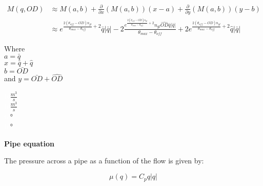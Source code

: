 \begin{equation}
\begin{split}
	M(q,OD) &\approx M(a,b) + \frac{\partial}{\partial x} (M(a,b)) (x-a) + \frac{\partial}{\partial y} (M(a,b)) (y-b) \\
			&\approx e^{\frac{2 (\theta_{off} - \bar{OD}) n_{gl}}{\theta_{max}-\theta_{off}}+2} \bar{q} |\bar{q}| -2 \frac{e^{\frac{2 (\theta_{off} - \bar{OD}) n_{gl}}{\theta_{max}-\theta_{off}}+2} n_{gl} \hat{OD} \bar{q} |\bar{q}|}{\theta_{max}-\theta_{off}} + 2 e^{\frac{2 (\theta_{off} - \bar{OD}) n_{gl}}{\theta_{max}-\theta_{off}}+2} \hat{q} |\bar{q}|
\end{split}
\end{equation}
 \begin{minipage}[t]{0.40\textwidth}
Where\\
\hspace*{8mm} $a=\bar{q}$ \\
\hspace*{8mm} $x=\bar{q}+\hat{q}$ \\
\hspace*{8mm} $b=\bar{OD}$ \\
and \hspace*{0.7mm} $y=\bar{OD}+\hat{OD}$ 
\end{minipage}
\begin{minipage}[t]{0.48\textwidth}
\vspace*{2mm}
\hspace*{8mm}
\hspace*{8mm}
\hspace*{8mm}
\hspace*{8mm}
\end{minipage}
\begin{minipage}[t]{0.10\textwidth}
\vspace*{2mm}
\textcolor{White}{te}$\unit{\frac{m^3}{s}}$\\
\textcolor{White}{te}$\unit{\frac{m^3}{s}}$\\
\textcolor{White}{te}$\unit{\degree}$\\
\textcolor{White}{te}$\unit{\degree}$
\end{minipage}	





\bigskip
\bigskip 
\textbf{Pipe equation}

The pressure across a pipe as a function of the flow is given by:

\begin{equation}
	\mu(q)=C_p q |q|
\end{equation}



